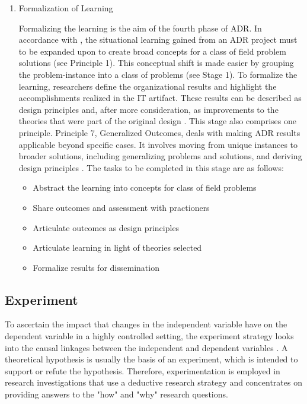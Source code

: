 {\begin{enumerate}
\begin{itemize}
        \item Reflect on the design and redesign during the project
        \item Evaluate adherence to principles
        \item Analyze intervention results according to stated goals
\end{itemize}
        \item Formalization of Learning
\par{Formalizing the learning is the aim of the fourth phase of ADR. In accordance with \cite{aken2004management}, the situational learning gained from an ADR project must to be expanded upon to create broad concepts for a class of field problem solutions (see Principle 1). This conceptual shift is made easier by grouping the problem-instance into a class of problems (see Stage 1). To formalize the learning, researchers define the organizational results and highlight the accomplishments realized in the IT artifact. These results can be described as design principles and, after more consideration, as improvements to the theories that were part of the original design \citep{sein2011action}. This stage also comprises one principle. Principle 7, Generalized Outcomes, deals with making ADR results applicable beyond specific cases. It involves moving from unique instances to broader solutions, including generalizing problems and solutions, and deriving design principles \citep{sein2011action}. The tasks to be completed in this stage are as follows:}
\begin{itemize}
        \item Abstract the learning into concepts for class of field problems
        \item Share outcomes and assessment with practioners
        \item Articulate outcomes as design principles
        \item Articulate learning in light of theories selected
        \item Formalize results for dissemination
\end{itemize}
\end{enumerate}}
\subsection{Experiment}
\par{To ascertain the impact that changes in the independent variable have on the dependent variable in a highly controlled setting, the experiment strategy looks into the causal linkages between the independent and dependent variables \citep{saunders2009research}. A theoretical hypothesis is usually the basis of an experiment, which is intended to support or refute the hypothesis. Therefore, experimentation is employed in research investigations that use a deductive research strategy and concentrates on providing answers to the "how" and "why" research questions.}
